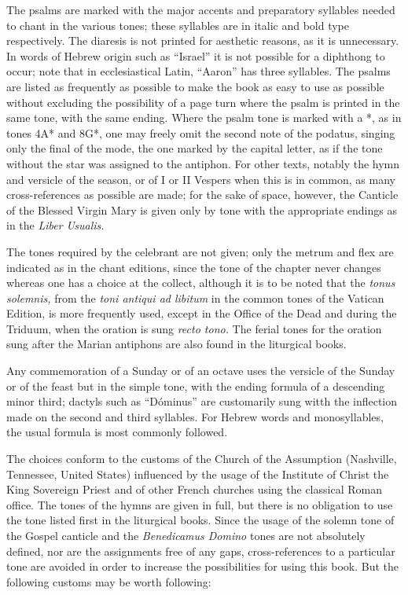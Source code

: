 \begin{enpars}
The psalms are marked with the major accents and preparatory syllables needed to chant in the various tones; these syllables are in italic and bold type respectively. The diaresis is not printed for aesthetic reasons, as it is unnecessary. In words of Hebrew origin such as ``Israel'' it is not possible for a diphthong to occur; note that in ecclesiastical Latin, ``Aaron'' has three syllables. The psalms are listed as frequently as possible to make the book as easy to use as possible without excluding the possibility of a page turn where the psalm is printed in the same tone, with the same ending. Where the psalm tone is marked with a *, as in tones 4A* and 8G*, one may freely omit the second note of the podatus, singing only the final of the mode, the one marked by the capital letter, as if the tone without the star was assigned to the antiphon. For other texts, notably the hymn and versicle of the season, or of I or II Vespers when this is in common, as many cross-references as possible are made; for the sake of space, however, the Canticle of the Blessed Virgin Mary is given only by tone with the appropriate endings as in the \textit{Liber Usualis.}

The tones required by the celebrant are not given; only the metrum and flex are indicated as in the chant editions, since the tone of the chapter never changes whereas one has a choice at the collect, although it is to be noted that the \textit{tonus solemnis,} from the \textit{toni antiqui ad libitum} in the common tones of the Vatican Edition, is more frequently used, except in the Office of the Dead and during the Triduum, when the oration is sung \textit{recto tono.} The ferial tones for the oration sung after the Marian antiphons are also found in the liturgical books.

Any commemoration of a Sunday or of an octave uses the versicle of the Sunday or of the feast but in the simple tone, with the ending formula of a descending minor third; dactyls such as ``Dóminus'' are customarily sung witth the inflection made on the second and third syllables. For Hebrew words and monosyllables, the usual formula is most commonly followed.


The choices conform to the customs of the Church of the Assumption (Nashville, Tennessee, United States) influenced by the usage of the Institute of Christ the King Sovereign Priest and of other French churches using the classical Roman office. The tones of the hymns are given in full, but there is no obligation to use the tone listed first in the liturgical books. Since the usage of the solemn tone of the Gospel canticle and the \textit{Benedicamus Domino} tones are not absolutely defined, nor are the assignments free of any gaps, cross-references to a particular tone are avoided in order to increase the possibilities for using this book. But the following customs may be worth following:


\end{enpars}
